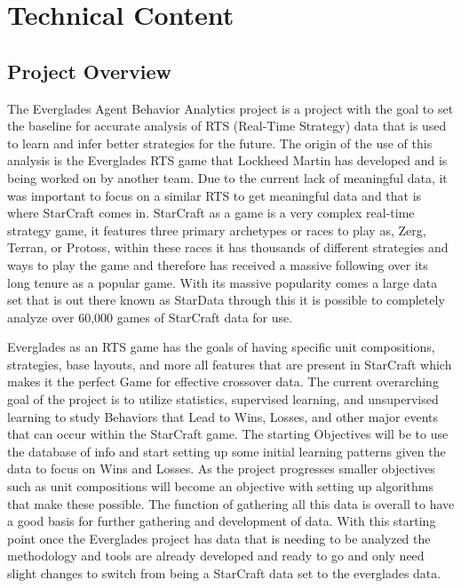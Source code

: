 \documentclass[a4paper,12pt]{report}
\begin{document}
\chapter{Technical Content}
\section{Project Overview}

The Everglades Agent Behavior Analytics project is a project with the goal to set the baseline for accurate analysis of RTS (Real-Time Strategy) data that is used to learn and infer better strategies for the future. The origin of the use of this analysis is the Everglades RTS game that Lockheed Martin has developed and is being worked on by another team. Due to the current lack of meaningful data, it was important to focus on a similar RTS to get meaningful data and that is where StarCraft comes in. StarCraft as a game is a very complex real-time strategy game, it features three primary archetypes or races to play as, Zerg, Terran, or Protoss, within these races it has thousands of different strategies and ways to play the game and therefore has received a massive following over its long tenure as a popular game. With its massive popularity comes a large data set that is out there known as StarData through this it is possible to completely analyze over 60,000 games of StarCraft data for use.

Everglades as an RTS game has the goals of having specific unit compositions, strategies, base layouts, and more all features that are present in StarCraft which makes it the perfect Game for effective crossover data. The current overarching goal of the project is to utilize statistics, supervised learning, and unsupervised learning to study Behaviors that Lead to Wins, Losses, and other major events that can occur within the StarCraft game. The starting Objectives will be to use the database of info and start setting up some initial learning patterns given the data to focus on Wins and Losses. As the project progresses smaller objectives such as unit compositions will become an objective with setting up algorithms that make these possible.  The function of gathering all this data is overall to have a good basis for further gathering and development of data. With this starting point once the Everglades project has data that is needing to be analyzed the methodology and tools are already developed and ready to go and only need slight changes to switch from being a StarCraft data set to the everglades data.
\end{document}
